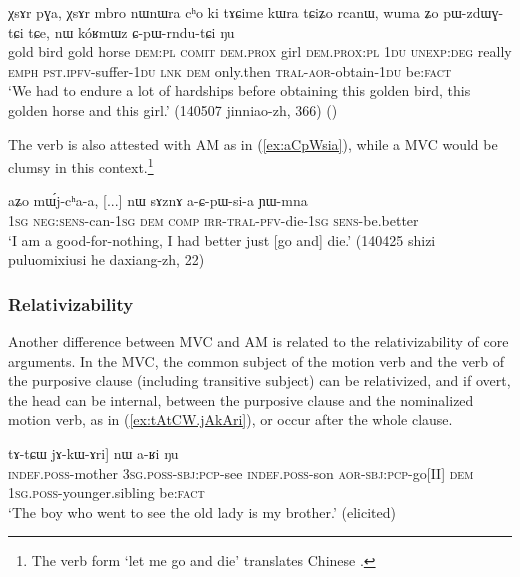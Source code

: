 \begin{exe}
\ex  \label{ex:CpWrndutCi}
\gll χsɤr pɣa, χsɤr mbro nɯnɯra cʰo ki tɤɕime kɯra tɕiʑo rcanɯ, wuma ʑo pɯ-zdɯɣ-tɕi tɕe, nɯ kóʁmɯz ɕ-pɯ-rndu-tɕi ŋu \\
gold bird gold horse \textsc{dem}:\textsc{pl} \textsc{comit} \textsc{dem}.\textsc{prox} girl \textsc{dem}.\textsc{prox}:\textsc{pl} \textsc{1du} \textsc{unexp}:\textsc{deg} really \textsc{emph} \textsc{pst}.\textsc{ipfv}-suffer-\textsc{1du} \textsc{lnk} \textsc{dem} only.then \textsc{tral}-\textsc{aor}-obtain-\textsc{1du} be:\textsc{fact} \\
\glt `We had to endure a lot of hardships before obtaining this golden bird, this golden horse and this girl.' (140507 jinniao-zh, 366)
()
\end{exe}


The verb  is also attested with AM as in (\ref{ex:aCpWsia}), while a MVC would be clumsy in this context.\footnote{The verb form  `let me go and die' translates Chinese . }

\begin{exe}
\ex  \label{ex:aCpWsia}
\gll aʑo mɯ́j-cʰa-a, [...] nɯ sɤznɤ a-ɕ-pɯ-si-a ɲɯ-mna \\
\textsc{1sg} \textsc{neg}:\textsc{sens}-can-\textsc{1sg} { } \textsc{dem} \textsc{comp} \textsc{irr}-\textsc{tral}-\textsc{pfv}-die-\textsc{1sg} \textsc{sens}-be.better \\
\glt `I am a good-for-nothing, I had better just [go and] die.' (140425 shizi puluomixiusi he daxiang-zh, 22)
\end{exe}

\subsubsection{Relativizability} \label{sec:AM.mvc.relativizability}
Another difference between MVC and AM is related to the relativizability of core arguments. In the MVC, the common subject of the motion verb and the verb of the purposive clause (including transitive subject) can be relativized, and if overt, the head can be internal, between the purposive clause and the nominalized motion verb, as  in (\ref{ex:tAtCW.jAkAri}), or occur after the whole clause.

\begin{exe}
\ex  \label{ex:tAtCW.jAkAri}
\gll  [[tɤ-mu ɯ-kɯ-rtoʁ] tɤ-tɕɯ jɤ-kɯ-ɤri] nɯ a-ʁi ŋu \\
\textsc{indef}.\textsc{poss}-mother \textsc{3sg}.\textsc{poss}-\textsc{sbj}:\textsc{pcp}-see \textsc{indef}.\textsc{poss}-son \textsc{aor}-\textsc{sbj}:\textsc{pcp}-go[II] \textsc{dem} \textsc{1sg}.\textsc{poss}-younger.sibling be:\textsc{fact} \\
\glt `The boy who went to see the old lady is my brother.' (elicited)
\end{exe}


